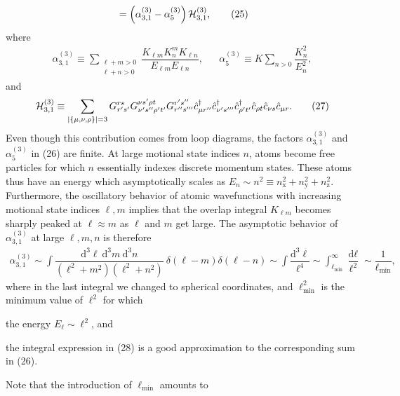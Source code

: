 \documentclass[preprint,showkeys,nofootinbib]{revtex4-1}
\renewcommand{\t}{\text} %
\newcommand{\f}{\dfrac} %
\newcommand{\p}[1]{\left(#1\right)} %
\renewcommand{\set}[1]{\left\{#1\right\}} %
\renewcommand{\d}{\text{d}}
\newcommand{\x}{\text{x}}
\newcommand{\y}{\text{y}}
\newcommand{\z}{\text{z}}
\renewcommand{\c}{\hat{c}}
\renewcommand{\H}{\mathcal{H}}
\newcommand{\1}{\mathds{1}}
\begin{document}
\begin{enumerate}
{\begin{align}
{\begin{tikzpicture}
        \end{tikzpicture}}
      = \p{\alpha_{3,1}^{(3)} - \alpha_5^{(3)}} \H_{3,1}^{(3)},
      \tag{25}
    \end{align}
    where
    \begin{align}
      \alpha_{3,1}^{(3)} \equiv \sum_{\substack{\ell+m>0\\\ell+n>0}}
      \f{K_{\ell m} K^m_n K_{\ell n}}{E_{\ell m} E_{\ell n}},
      &&
      \alpha_5^{(3)}
      \equiv  K \sum_{n>0} \f{K_n^2}{E_n^2},
      \tag{26}
    \end{align}
    and
    \begin{align}
      \H_{3,1}^{(3)} \equiv \sum_{\abs{\set{\mu,\nu,\rho}}=3}
      G^{rs}_{r's'} G^{\nu s'\rho t}_{\nu's''\rho't'} G^{r's''}_{r''s'''}
      \c_{\mu r''}^\dag \c_{\nu's'''}^\dag \c_{\rho't'}^\dag
      \c_{\rho t} \c_{\nu s} \c_{\mu r}.
      \tag{27}
    \end{align}
    Even though this contribution comes from loop diagrams, the
    factors $\alpha_{3,1}^{(3)}$ and $\alpha_5^{(3)}$ in (26) are
    finite.  At large motional state indices $n$, atoms become free
    particles for which $n$ essentially indexes discrete momentum
    states.  These atoms thus have an energy which asymptotically
    scales as $E_n\sim n^2\equiv n_\x^2+n_\y^2+n_\z^2$.  Furthermore,
    the oscillatory behavior of atomic wavefunctions with increasing
    motional state indices $\ell,m$ implies that the overlap integral
    $K_{\ell m}$ becomes sharply peaked at $\ell\approx m$ as $\ell$
    and $m$ get large.  The asymptotic behavior of
    $\alpha_{3,1}^{(3)}$ at large $\ell,m,n$ is therefore
    \begin{align}
      \alpha_{3,1}^{(3)}
      \sim \int \f{\d^3\ell~\d^3m~\d^3n}{\p{\ell^2+m^2}\p{\ell^2+n^2}}
      ~\delta\p{\ell-m}\delta\p{\ell-n}
      \sim \int \f{\d^3\ell}{\ell^4}
      \sim \int_{\ell_{\t{min}}}^\infty \f{\d\ell}{\ell^2}
      \sim \f1{\ell_{\t{min}}},
      \tag{28}
    \end{align}
    where in the last integral we changed to spherical coordinates,
    and $\ell_{\t{min}}^2$ is the minimum value of $\ell^2$ for which
    \begin{enumerate*}
    \item the energy $E_\ell\sim\ell^2$, and
    \item the integral expression in (28) is a good approximation to
      the corresponding sum in (26).
    \end{enumerate*}
    Note that the introduction of $\ell_{\t{min}}$ amounts to
}
\end{enumerate}
\end{document}
